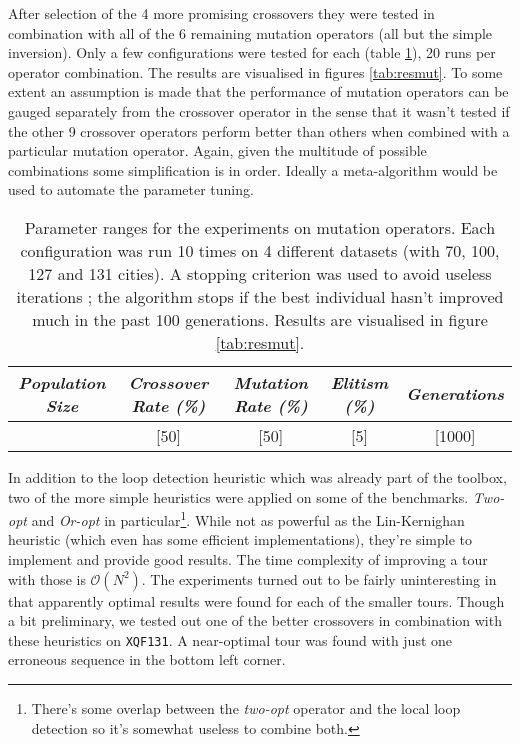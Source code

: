 \par\noindent After selection of the 4 more promising crossovers they were tested in combination with all of the 6 remaining mutation operators (all but the simple inversion). Only a few configurations were tested for each (table \ref{tab:par3}), 20 runs per operator combination. The results are visualised in figures \ref{tab:resmut}. To some extent an assumption is made that the performance of mutation operators can be gauged separately from the crossover operator in the sense that it wasn't tested if the other 9 crossover operators perform better than others when combined with a particular mutation operator. Again, given the multitude of possible combinations some simplification is in order. Ideally a meta-algorithm would be used to automate the parameter tuning.

\begin{table}[h]
\centering
\begin{tabular}{c|c|c|c|c}
\textit{Population Size} & \textit{Crossover Rate (\%)} & \textit{Mutation Rate (\%)} & \textit{Elitism (\%)} & \textit{Generations} \\\hline 
[300] & [50] & [50] & [5] & [1000]
\end{tabular}
\caption{Parameter ranges for the experiments on mutation operators. Each configuration was run 10 times on 4 different datasets (with 70, 100, 127 and 131 cities). A stopping criterion was used to avoid useless iterations ; the algorithm stops if the best individual hasn't improved much in the past 100 generations. Results are visualised in figure \ref{tab:resmut}.}
\label{tab:par3}
\end{table}


In addition to the loop detection heuristic which was already part of the toolbox, two of the more simple heuristics were applied on some of the benchmarks. \textit{Two-opt} and \textit{Or-opt} in particular\footnote{There's some overlap between the \textit{two-opt} operator and the local loop detection so it's somewhat useless to combine both.}. While not as powerful as the Lin-Kernighan heuristic (which even has some efficient implementations), they're simple to implement and provide good results. The time complexity of improving a tour with those is $\mathcal{O}(N^2)$. The experiments turned out to be fairly uninteresting in that apparently optimal results were found for each of the smaller tours. Though a bit preliminary, we tested out one of the better crossovers in combination with these heuristics on \texttt{XQF131}. A near-optimal tour was found with just one erroneous sequence in the bottom left corner.\\

